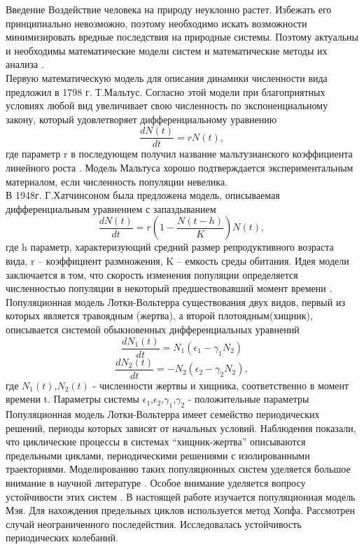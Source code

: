 \documentclass[12pt]{article}
\begin{document}
Введение
Воздействие человека на природу неуклонно растет. Избежать его принципиально невозможно, поэтому необходимо искать возможности минимизировать вредные последствия на природные системы. Поэтому актуальны и необходимы математические модели систем и математические методы их анализа \cite{baz}.\\
Первую математическую модель для описания динамики численности вида предложил в 1798 г. Т.Мальтус. Согласно этой модели при благоприятных условиях любой вид увеличивает свою численность по экспоненциальному закону, который удовлетворяет дифференциальному уравнению 
\begin{equation*}
    \frac{d N(t)}{d t}=r N(t),
\end{equation*}
где параметр  r   в последующем получил название мальтузианского коэффициента линейного роста \cite{Dolgiy}. Модель Мальтуса хорошо подтверждается экспериментальным материалом, если численность популяции невелика. \\
В 1948г. Г.Хатчинсоном была предложена модель, описываемая дифференциальным уравнением с запаздыванием
\begin{equation*}
    \frac{d N(t)}{d t}=r \left(1 - \frac{N(t-h)}{K} \right) N(t),
\end{equation*}
где h параметр, характеризующий средний размер репродуктивного возраста вида, r – коэффициент размножения, K – емкость среды обитания. Идея модели заключается в том, что скорость изменения популяции определяется численностью популяции в некоторый предшествовавший момент времени \cite{Dolgiy}. \\
Популяционная модель Лотки-Вольтерра существования двух видов, первый из которых является травоядным (жертва), а второй плотоядным(хищник), описывается системой обыкновенных дифференциальных уравнений 
\begin{equation*}
    \frac{d N_1 (t)}{d t}=N_1 (\epsilon_1 - \gamma_1 N_2)
\end{equation*}
\begin{equation*}
    \frac{d N_2 (t)}{d t}= -N_2 (\epsilon_2 - \gamma_2 N_2),
\end{equation*}
где $N_1(t)$,$N_2(t)$ - численности жертвы и хищника, соответственно в момент времени t. Параметры системы $\epsilon_1$,$\epsilon_2$,$\gamma_1$,$\gamma_2$ - положительные параметры \cite{has}
Популяционная модель Лотки-Вольтерра  имеет семейство периодических решений, периоды которых зависят от начальных условий. Наблюдения показали, что циклические процессы в системах “хищник-жертва” описываются предельными циклами, периодическими решениями с изолированными траекториями. Моделированию таких популяционных систем уделяется большое внимание в научной литературе \cite{has}.  Особое внимание уделяется вопросу устойчивости этих систем\cite{svir} . В настоящей работе изучается популяционная модель Мэя. Для нахождения предельных циклов используется метод Хопфа. Рассмотрен случай неограниченного последействия. Исследовалась устойчивость периодических колебаний.
\end{document}
